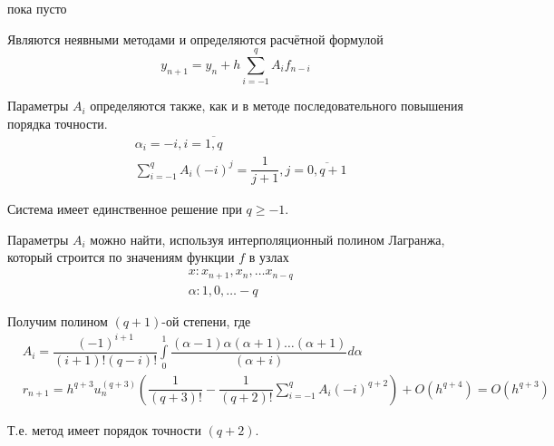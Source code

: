 \begin{col-answer-preambule}
	\begin{plan}
    \item пока пусто
	\end{plan}
\end{col-answer-preambule}


Являются неявными методами и определяются расчётной формулой
\begin{equation}
  y_{n + 1} = y_n + h\sum\limits_{i = -1}^qA_if_{n - i}
\end{equation}

Параметры $A_i$ определяются также, как и в методе последовательного повышения
порядка точности.
\begin{equation}
  \begin{split}
    &\alpha_i = -i, i = \overline{1, q}\\
    &\sum\limits_{i = -1}^qA_i(-i)^j = \dfrac{1}{j + 1}, j = \overline{0, q + 1}
  \end{split}
\end{equation}

Система имеет единственное решение при $q \geqslant -1$.

Параметры $A_i$ можно найти, используя интерполяционный полином Лагранжа, который
строится по значениям функции $f$ в узлах
\begin{align*}
  &x: x_{n + 1}, x_n, \ldots x_{n - q}\\
  &\alpha: 1, 0, \ldots -q
\end{align*}

Получим полином $(q + 1)$-ой степени, где
\begin{align}
  &A_i = \dfrac{(-1)^{i + 1}}{(i + 1)!(q - i)!}\int\limits_0^1
  \dfrac{(\alpha - 1)\alpha(\alpha + 1)\ldots(\alpha + 1)}{(\alpha + i)}d\alpha\\
  &r_{n + 1} = h^{q + 3}u_n^{(q + 3)}\left(\dfrac{1}{(q + 3)!}
  - \dfrac{1}{(q + 2)!}\sum\limits_{i = -1}^q A_i(-i)^{q + 2}\right)
  + O(h^{q + 4}) = O(h^{q + 3})
\end{align}

Т.е. метод имеет порядок точности $(q + 2)$.

